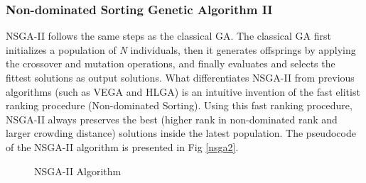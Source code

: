 \documentclass[10pt,journal,compsoc]{IEEEtran}
\begin{document}
\subsubsection{Non-dominated Sorting Genetic Algorithm II}
NSGA-II follows the same steps as the classical GA. The classical GA first initializes a population of \textit{N} individuals, then it generates offsprings by applying the crossover and mutation operations, and finally evaluates and selects the fittest solutions as output solutions. What differentiates NSGA-II from previous algorithms (such as VEGA and HLGA) is an intuitive invention of the fast elitist ranking procedure (Non-dominated Sorting). Using this fast ranking procedure, NSGA-II always preserves the best (higher rank in non-dominated rank and larger crowding distance) solutions inside the latest population. 
The pseudocode of the NSGA-II algorithm is presented in Fig \ref{nsga2}.
\begin{figure}[h]
\caption{NSGA-II Algorithm}
\indent{}
\end{figure}
\end{document}
